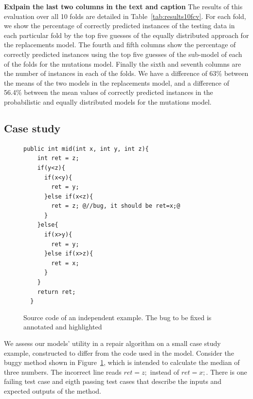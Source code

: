 \documentclass[conference]{IEEEtran}
\newcommand{\todo}[1]
  {{\scriptsize \textbf{\color{red} {#1}}}}
\begin{document}
\todo{Exlpain the last two columns in the text and caption}
The results of this evaluation over all 10 folds are detailed in
Table~\ref{tab:results10fcv}. For each fold, we show the percentage of correctly 
predicted instances of the testing data in each particular fold by the top five
guesses of the equally distributed approach for the replacements model. The
fourth and fifth columns show the percentage of correctly predicted
instances using the top five  
guesses of the sub-model of each of the folds for the mutations model. Finally the sixth and seventh columns are the number of instances in each of the folds. We have a difference of 63\% between the means of the two models in the replacements model, and a difference of 56.4\% between the mean values of correctly predicted instances in the probabilistic and equally distributed models for the mutations model.

\subsection{Case study}
\label{sec:casestudy}


\begin{figure}[t]
\begin{lstlisting}[frame=single,style=base]
  public int mid(int x, int y, int z){
    int ret = z;  
    if(y<z){
      if(x<y){
        ret = y;
      }else if(x<z){
        ret = z; @//bug, it should be ret=x;@
      }
    }else{
      if(x>y){
        ret = y;
      }else if(x>z){
        ret = x;
      }
    }
    return ret;
  }	
	\end{lstlisting}
	\caption{Source code of an independent example. The bug to be fixed is annotated and highlighted}
	\label{fig:initialExample}
\end{figure}

We assess our
models' utility in a repair algorithm on a small case study example, constructed
to differ from the code used in the model.  Consider the buggy method shown in
Figure~\ref{fig:initialExample}, which is intended to  calculate the median 
of three numbers.  The incorrect line reads 
$ret = z;$ instead of $ret = x;$. There is one failing test case and eigth passing test cases that describe the inputs and expected outputs of the method.
\end{document}
